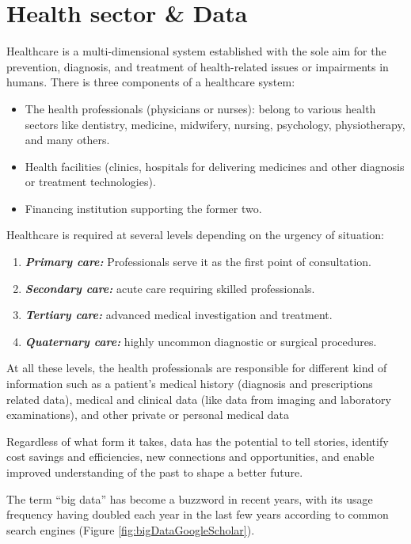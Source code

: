 \chapter{Health sector \& Data}

Healthcare is a multi-dimensional system established with the sole aim for the prevention, diagnosis, and treatment of health-related issues or impairments in humans. There is three components of a healthcare system\cite{dash2019big}:
\begin{itemize}
    \item The health professionals (physicians or nurses): belong to various health sectors like dentistry, medicine, midwifery, nursing, psychology, physiotherapy, and many others.
    \item Health facilities (clinics, hospitals for delivering medicines and other diagnosis or treatment technologies).
    \item Financing institution supporting the former two.
  \end{itemize}
  Healthcare is required at several levels depending on the urgency of situation:
  \begin{enumerate}
    \item \textbf{\textit{Primary care:}} Professionals serve it as the first point of consultation.
    \item \textbf{\textit{Secondary care:}} acute care requiring skilled professionals.
    \item \textbf{\textit{Tertiary care:}} advanced medical investigation and treatment.
    \item \textbf{\textit{Quaternary care:}} highly uncommon diagnostic or surgical procedures.
  \end{enumerate}
 At all these levels, the health professionals are responsible for different kind of information such as a patient's medical history (diagnosis and prescriptions related data), medical and clinical data (like data from imaging and laboratory examinations), and other private or personal medical data


Regardless of what form it takes, data has the potential to tell stories, identify cost savings and efficiencies, new connections and opportunities, and enable improved understanding of the past to shape a better future\cite{Zillner2016}.

The term “big data” has become a buzzword in recent years, with its usage frequency having doubled each year in the last few years according to common search engines (Figure \ref{fig:bigDataGoogleScholar}).

